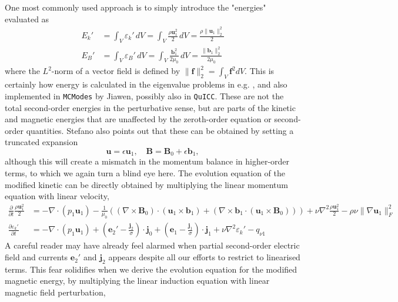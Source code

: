 One most commonly used approach is to simply introduce the "energies" evaluated as
%
\begin{equation}
\begin{aligned}
    E_k' &= \int_V \varepsilon_k' \, dV = \int_V \frac{\rho \mathbf{u}_1^2}{2} \, dV = \frac{\rho \|\mathbf{u}_1\|_2^2}{2} \\ 
    E_B' &= \int_V \varepsilon_B' \, dV = \int_V \frac{\mathbf{b}_1^2}{2\mu_0} \, dV = \frac{\|\mathbf{b}_1\|_2^2}{2\mu_0}
\end{aligned}
\end{equation}
%
where the $L^2$-norm of a vector field is defined by $\|\mathbf{f}\|_2^2 = \int_V \mathbf{f}^2 dV$. This is certainly how energy is calculated in the eigenvalue problems in e.g. \citet{gerick_qg_2021}, and also implemented in \texttt{MCModes} by Jiawen, possibly also in \texttt{QuICC}.
These are not the total second-order energies in the perturbative sense, but are parts of the kinetic and magnetic energies that are unaffected by the zeroth-order equation or second-order quantities. Stefano also points out that these can be obtained by setting a truncated expansion
%
\[
    \mathbf{u} = \epsilon \mathbf{u}_1,\quad \mathbf{B} = \mathbf{B}_0 + \epsilon \mathbf{b}_1,
\]
%
although this will create a mismatch in the momentum balance in higher-order terms, to which we again turn a blind eye here. The evolution equation of the modified kinetic can be directly obtained by multiplying the linear momentum equation with linear velocity,
%
\[
\begin{aligned}
    \frac{\partial}{\partial t} \frac{\rho \mathbf{u}_1^2}{2} &= - \nabla\cdot (p_1 \mathbf{u}_1) - \frac{1}{\mu_0} \left((\nabla\times \mathbf{B}_0)\cdot (\mathbf{u}_1\times \mathbf{b}_1) + (\nabla\times \mathbf{b}_1\cdot (\mathbf{u}_1\times \mathbf{B}_0))\right) + \nu \nabla^2 \frac{\rho \mathbf{u}_1^2}{2} - \rho \nu \|\nabla\mathbf{u}_1\|_F^2 \\ 
    \frac{\partial \varepsilon_k'}{\partial t} &= - \nabla\cdot (p_1 \mathbf{u}_1) + \left(\mathbf{e}_2' - \frac{\mathbf{j}_2}{\sigma}\right)\cdot \mathbf{j}_0 + \left(\mathbf{e}_1 - \frac{\mathbf{j}_1}{\sigma}\right)\cdot \mathbf{j}_1 + \nu \nabla^2 \varepsilon_k' - q_{\nu 1}
\end{aligned}
\]
%
A careful reader may have already feel alarmed when partial second-order electric field and currents $\mathbf{e}_2'$ and $\mathbf{j}_2$ appears despite all our efforts to restrict to linearised terms.
This fear solidifies when we derive the evolution equation for the modified magnetic energy, by multiplying the linear induction equation with linear magnetic field perturbation,
